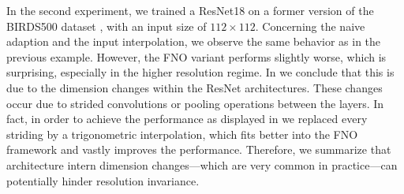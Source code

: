 In the second experiment, we trained a ResNet18 \cite{he2016deep} on a former version of the BIRDS500 dataset \cite{pio450}, with an input size of $112\times 112$. Concerning the naive adaption and the input interpolation, we observe the same behavior as in the previous example. However, the FNO variant performs slightly worse, which is surprising, especially in the higher resolution regime. In \cite{kabri2023resolution} we conclude that this is due to the dimension changes within the ResNet architectures. These changes occur due to strided convolutions or pooling operations between the layers. In fact, in order to achieve the performance as displayed in \cite[Fig. 4 (b)]{kabri2023resolution} we replaced every striding by a trigonometric interpolation, which fits better into the FNO framework and vastly improves the performance. Therefore, we summarize that architecture intern dimension changes---which are very common in practice---can potentially hinder resolution invariance.
%
%
\clearpage%
%
%
